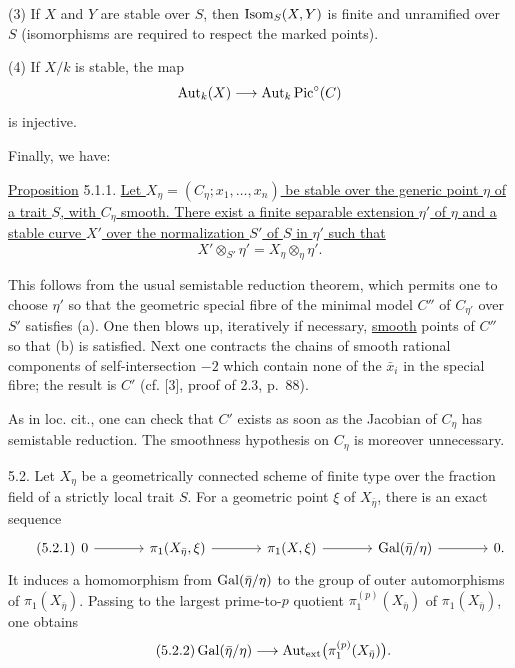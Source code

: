 
(3) If $X$ and $Y$ are stable over $S$, then $\operatorname{Isom}_S(X,Y)$ is finite
and unramified over $S$ (isomorphisms are required to respect the marked
points).

(4) If $X/k$ is stable, the map
\[
\operatorname{Aut}_k(X)\longrightarrow\operatorname{Aut}_k\operatorname{Pic}^\circ(C)
\]
is injective.

Finally, we have:

\underline{Proposition} 5.1.1. \underline{Let
$X_\eta=(C_\eta;x_1,\ldots,x_n)$ be stable over the generic point
$\eta$ of a trait $S$, with $C_\eta$ smooth. There exist a finite
separable extension $\eta'$ of $\eta$ and a stable curve $X'$ over the
normalization $S'$ of $S$ in $\eta'$ such that}
\begin{equation*}
X'\otimes_{S'}\eta'=X_\eta\otimes_\eta\eta'.
\end{equation*}

This follows from the usual semistable reduction theorem, which permits
one to choose $\eta'$ so that the geometric special fibre of the minimal
model $C''$ of $C_{\eta'}$ over $S'$ satisfies (a). One then blows up,
iteratively if necessary, \underline{smooth} points of $C''$ so that
(b) is satisfied. Next one contracts the chains of smooth rational
components of self-intersection $-2$ which contain none of the
$\bar x_i$ in the special fibre; the result is $C'$ (cf. [3], proof of
2.3, p.~88).

As in loc. cit., one can check that $C'$ exists as soon as the Jacobian
of $C_\eta$ has semistable reduction. The smoothness hypothesis on
$C_\eta$ is moreover unnecessary.

5.2. Let $X_\eta$ be a geometrically connected scheme of finite type
over the fraction field of a strictly local trait $S$. For a geometric
point $\xi$ of $X_{\bar\eta}$, there is an exact sequence
\begin{equation}\tag{5.2.1}
\begin{tikzcd}[column sep=large, row sep=tiny]
0 \arrow[r] & \pi_1(X_{\bar\eta},\xi) \arrow[r]
  & \pi_1(X,\xi) \arrow[r]
  & \Gal(\bar\eta/\eta) \arrow[r] & 0 .
\end{tikzcd}
\end{equation}
It induces a homomorphism from $\operatorname{Gal}(\bar\eta/\eta)$ to the group of
outer automorphisms of $\pi_1(X_{\bar\eta})$. Passing to the largest
prime-to-$p$ quotient $\pi_1^{(p)}(X_{\bar\eta})$ of
$\pi_1(X_{\bar\eta})$, one obtains
\begin{equation}\tag{5.2.2}
\operatorname{Gal}(\bar\eta/\eta)
\longrightarrow
\operatorname{Aut}_{\mathrm{ext}}\bigl(\pi_1^{(p)}(X_{\bar\eta})\bigr).
\end{equation}


